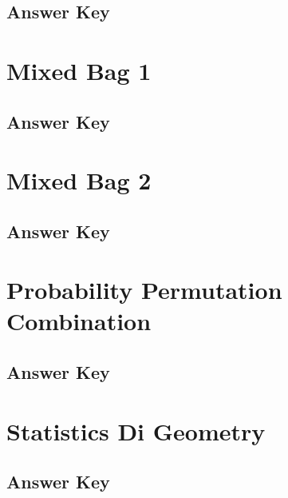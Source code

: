 \documentclass[12pt,a4paper]{book}
\begin{document}


\subsection*{Answer Key}



\section{Mixed Bag 1}



\subsection*{Answer Key}



\section{Mixed Bag 2}



\subsection*{Answer Key}



\section{Probability Permutation Combination}



\subsection*{Answer Key}



\section{Statistics Di Geometry}



\subsection*{Answer Key}


\end{document}
